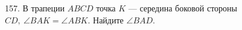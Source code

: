 157. В трапеции $ABCD$ точка $K$ --- середина боковой стороны $CD,\ \angle BAK=\angle ABK.$ Найдите $\angle BAD.$\\
